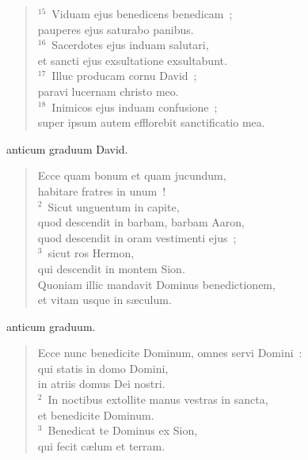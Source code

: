 \begin{flushleft}
\begin{verse}
${}^{15}$~Viduam ejus benedicens benedicam~;\\ pauperes ejus saturabo panibus.\\
${}^{16}$~Sacerdotes ejus induam salutari,\\ et sancti ejus exsultatione exsultabunt.\\
${}^{17}$~Illuc producam cornu David~;\\ paravi lucernam christo meo.\\
${}^{18}$~Inimicos ejus induam confusione~;\\ super ipsum autem efflorebit sanctificatio mea.\end{verse}\end{flushleft}



\bchapter
{}anticum graduum David. \begin{flushleft}\begin{verse}\vspace{6pt}Ecce quam bonum et quam jucundum,\\ habitare fratres in unum~!\\
${}^{2}$~Sicut unguentum in capite,\\ quod descendit in barbam, barbam Aaron,\\ quod descendit in oram vestimenti ejus~;\\
${}^{3}$~sicut ros Hermon,\\ qui descendit in montem Sion.\\ Quoniam illic mandavit Dominus benedictionem,\\ et vitam usque in s\ae culum.\end{verse}\end{flushleft}



\bchapter
{}anticum graduum. \begin{flushleft}\begin{verse}\vspace{6pt}Ecce nunc benedicite Dominum, omnes servi Domini~:\\ qui statis in domo Domini,\\ in atriis domus Dei nostri.\\
${}^{2}$~In noctibus extollite manus vestras in sancta,\\ et benedicite Dominum.\\
${}^{3}$~Benedicat te Dominus ex Sion,\\ qui fecit c\ae lum et terram.\end{verse}\end{flushleft}



